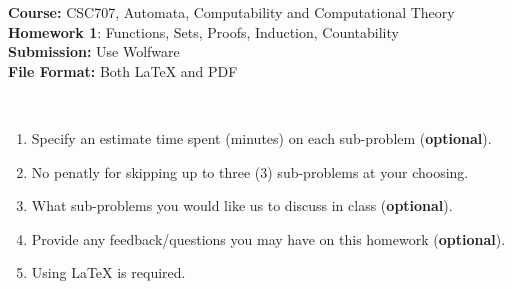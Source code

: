 \documentclass{article}%
\begin{document}
\begin{flushleft}
\textbf{Course:} CSC707, Automata, Computability and Computational Theory\\
\textbf{Homework 1}: Functions, Sets, Proofs, Induction, Countability\\
\textbf{Submission:} Use Wolfware\\
\textbf{File Format:} Both LaTeX and PDF\\
\end{flushleft}

\begin{center}
\\
\begin{enumerate}
	\item Specify an estimate time spent (minutes) on each sub-problem (\textbf{optional}).
	\item No penatly for skipping up to three (3) sub-problems at your choosing. 
	\item What sub-problems you would like us to discuss in class (\textbf{optional}). 
	\item Provide any feedback/questions you may have on this homework (\textbf{optional}).
	\item Using LaTeX is required.
\end{enumerate}
\end{center}

\noindent{\hrulefill}

\bigskip
\end{document}
